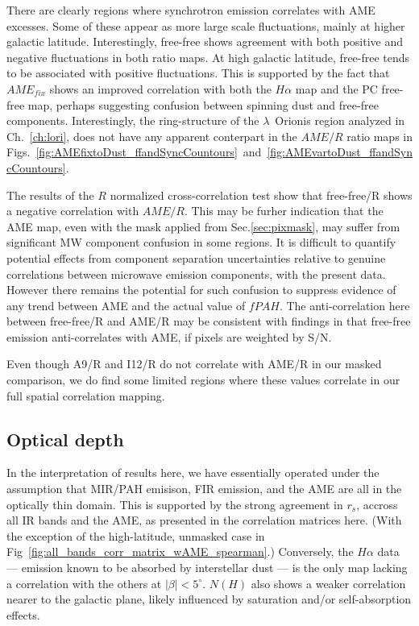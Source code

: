              There are clearly regions where synchrotron emission correlates with AME excesses. Some of these appear as more large scale fluctuations, mainly at higher galactic latitude. Interestingly, free-free shows agreement with both positive and negative fluctuations in both ratio maps. At high galactic latitude, free-free tends to be associated with positive fluctuations. This is supported by the fact that $AME_{fix}$ shows an improved correlation with both the $H\alpha{}$ map and the PC free-free map, perhaps suggesting confusion between spinning dust and free-free components. Interestingly, the ring-structure of the $\lambda$~Orionis region analyzed in Ch.~\ref{ch:lori}, does not have any apparent conterpart in the $AME/R$ ratio maps in Figs.~\ref{fig:AMEfixtoDust_ffandSyncCountours}~and~\ref{fig:AMEvartoDust_ffandSyncCountours}.

             The results of the $R$ normalized cross-correlation test show that free-free/R shows a negative correlation with $AME/R$. This may be furher indication that the AME map, even with the mask applied from Sec.\ref{sec:pixmask}, may suffer from significant MW component confusion in some regions. It is difficult to quantify potential effects from component separation uncertainties relative to genuine correlations between microwave emission components, with the present data. However there remains the potential for such confusion to suppress evidence of any trend between AME and the actual value of $fPAH$. The anti-correlation here between free-free/R and AME/R may be consistent with findings in \cite{vonHausegger15} that free-free emission anti-correlates with AME, if pixels are weighted by S/N.

             Even though A9/R and I12/R do not correlate with AME/R in our masked comparison, we do find some limited regions where these values correlate in our full spatial correlation mapping.

            \subsection{Optical depth}
              In the interpretation of results here, we have essentially operated under the assumption that MIR/PAH emisison, FIR emission, and the AME are all in the optically thin domain. This is supported by the strong agreement in $r_{s}$, accross all IR bands and the AME, as presented in the correlation matrices here. (With the exception of the high-latitude, unmasked case in Fig~\ref{fig:all_bands_corr_matrix_wAME_spearman}.) Conversely, the $H{\alpha}$ data --- emission known to be absorbed by interstellar dust --- is the only map lacking a correlation with the others at $|\beta{}|<5^{\circ}$. $N(H)$ also shows a weaker correlation nearer to the galactic plane, likely influenced by saturation and/or self-absorption effects.

